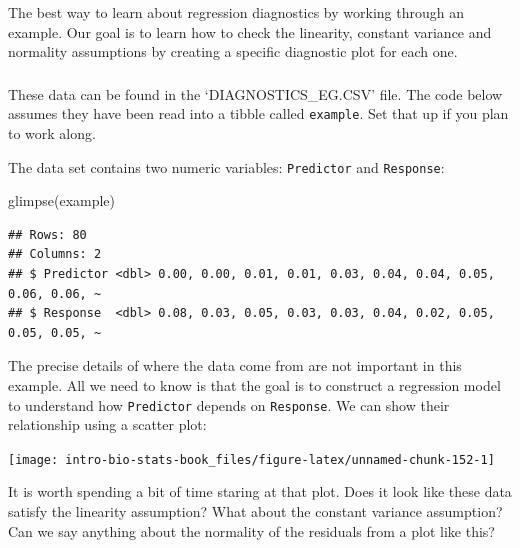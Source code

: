 \documentclass[
]{book}
\newenvironment{Shaded}{\begin{snugshade}}{\end{snugshade}}
\newcommand{\FunctionTok}[1]{\textcolor[rgb]{0.00,0.00,0.00}{#1}}
\newcommand{\NormalTok}[1]{#1}
\newenvironment{greybox}{
  \definecolor{shadecolor}{rgb}{0.95,0.95,0.95}  %
  \color{black}
  \begin{shaded}}
 {\end{shaded}}
\newenvironment{infobox}[1]
  {
  \begin{itemize}
  \renewcommand{\labelitemi}{
    \raisebox{-.7\height}[0pt][0pt]{
      {\setkeys{Gin}{width=3em,keepaspectratio}
        \texttt{[image: images/\#1]}}
    }
  }
  \setlength{\fboxsep}{1em}
  \begin{greybox}
  \item
  }
  {
  \end{greybox}
  \end{itemize}
  }
\begin{document}
The best way to learn about regression diagnostics by working through an example. Our goal is to learn how to check the linearity, constant variance and normality assumptions by creating a specific diagnostic plot for each one.

\begin{infobox}{action}

\hypertarget{section-12}{%
\subsubsection*{}\label{section-12}}

These data can be found in the `DIAGNOSTICS\_EG.CSV' file. The code below assumes they have been read into a tibble called \texttt{example}. Set that up if you plan to work along.

\end{infobox}

The data set contains two numeric variables: \texttt{Predictor} and \texttt{Response}:

\begin{Shaded}
\begin{Highlighting}[]
\FunctionTok{glimpse}\NormalTok{(example)}
\end{Highlighting}
\end{Shaded}

\begin{verbatim}
## Rows: 80
## Columns: 2
## $ Predictor <dbl> 0.00, 0.00, 0.01, 0.01, 0.03, 0.04, 0.04, 0.05, 0.06, 0.06, ~
## $ Response  <dbl> 0.08, 0.03, 0.05, 0.03, 0.03, 0.04, 0.02, 0.05, 0.05, 0.05, ~
\end{verbatim}

The precise details of where the data come from are not important in this example. All we need to know is that the goal is to construct a regression model to understand how \texttt{Predictor} depends on \texttt{Response}. We can show their relationship using a scatter plot:

\begin{center}\texttt{[image: intro-bio-stats-book\_files/figure-latex/unnamed-chunk-152-1]} \end{center}

It is worth spending a bit of time staring at that plot. Does it look like these data satisfy the linearity assumption? What about the constant variance assumption? Can we say anything about the normality of the residuals from a plot like this?
\end{document}
